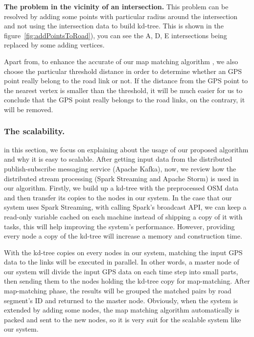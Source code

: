 \documentclass{acm_proc_article-sp}
\begin{document}
\textbf{The problem in the vicinity of an intersection.} This problem can be resolved by adding some points with particular radius around the intersection and not using the intersection data to build kd-tree. This is shown in the figure~\ref{fig:addPointsToRoad}), you can see the A, D, E intersections being replaced by some adding vertices.

Apart from, to enhance the accurate of our map matching algorithm , we also choose  the particular threshold distance in order to determine whether an GPS point really belong to the road link or not. If the distance from the GPS point to the nearest vertex is smaller than the threshold, it will be much easier for us to conclude that the GPS point really belongs to the road links, on the contrary, it will be removed.

\subsubsection{The scalability.}

in this section, we focus on explaining about the usage of our proposed algorithm and why it is easy to scalable. After getting input data from the distributed publish-subscribe messaging service (Apache Kafka), now, we review how the distributed stream processing (Spark Streaming and Apache Storm) is used in our algorithm. Firstly, we build up a kd-tree with the preprocessed OSM data and then transfer its copies to the nodes in our system. In the case that our system uses Spark Streaming, with calling Spark's broadcast API, we can keep a read-only variable cached on each machine instead of shipping a copy of it with tasks, this will help improving the system's performance. However, providing every node a copy of the kd-tree will increase a memory and construction time.

With the kd-tree copies on every nodes in our system, matching the input GPS data to the links will be executed in parallel. In other words, a master node of our system will divide the input GPS data on each time step into small parts, then sending them to the nodes holding the kd-tree copy for map-matching. After map-matching phase, the results will be grouped the matched pairs by road segment's ID and returned to the master node. Obviously, when the system is extended by adding some nodes, the map matching algorithm automatically is packed and sent to the new nodes, so it is very suit for the scalable system like our system.
\end{document}
